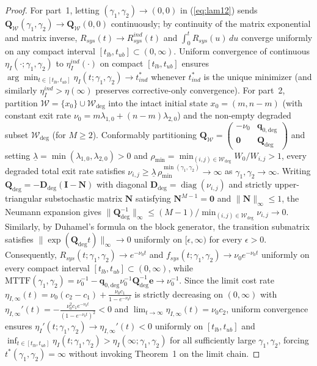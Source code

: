 \documentclass[10pt,a4paper]{article}
\begin{document}
\begin{proof}
For part~1, letting $(\gamma_1, \gamma_2) \to (0, 0)$ in (\ref{eq:lam12}) sends $\mathbf{Q}_{\mathcal{W}}(\gamma_1, \gamma_2) \to \mathbf{Q}_{\mathcal{W}}(0, 0)$ continuously; by continuity of the matrix exponential and matrix inverse, $R_{sys}(t) \to R_{sys}^{ind}(t)$ and $\int_0^t R_{sys}(u)\,du$ converge uniformly on any compact interval $[t_{lb}, t_{ub}] \subset (0, \infty)$. Uniform convergence of continuous $\eta_I(\cdot; \gamma_1, \gamma_2)$ to $\eta_I^{ind}(\cdot)$ on compact $[t_{lb}, t_{ub}]$ ensures $\arg\min_{t \in [t_{lb}, t_{ub}]} \eta_I(t; \gamma_1, \gamma_2) \to t_{ind}^*$ whenever $t_{ind}^*$ is the unique minimizer (and similarly $\eta_I^{ind} > \eta(\infty)$ preserves corrective-only convergence). For part~2, partition $\mathcal{W} = \{x_0\} \cup \mathcal{W}_{\mathrm{deg}}$ into the intact initial state $x_0 = (m, n - m)$ (with constant exit rate $\nu_0 = m\lambda_{1,0} + (n - m)\lambda_{2,0}$) and the non-empty degraded subset $\mathcal{W}_{\mathrm{deg}}$ (for $M \ge 2$). Conformably partitioning $\mathbf{Q}_{\mathcal{W}} = \begin{pmatrix} -\nu_0 & \mathbf{q}_{0,\mathrm{deg}} \\ \mathbf{0} & \mathbf{Q}_{\mathrm{deg}} \end{pmatrix}$ and setting $\underline{\lambda} = \min(\lambda_{1,0}, \lambda_{2,0}) > 0$ and $\rho_{\min} = \min_{(i,j)\in\mathcal{W}_{\mathrm{deg}}} W_0/W_{i,j} > 1$, every degraded total exit rate satisfies $\nu_{i,j} \ge \underline{\lambda}\,\rho_{\min}^{\min(\gamma_1,\gamma_2)} \to \infty$ as $\gamma_1, \gamma_2 \to \infty$. Writing $\mathbf{Q}_{\mathrm{deg}} = -\mathbf{D}_{\mathrm{deg}}(\mathbf{I} - \mathbf{N})$ with diagonal $\mathbf{D}_{\mathrm{deg}} = \operatorname{diag}(\nu_{i,j})$ and strictly upper-triangular substochastic matrix $\mathbf{N}$ satisfying $\mathbf{N}^{M-1} = \mathbf{0}$ and $\|\mathbf{N}\|_\infty \le 1$, the Neumann expansion gives $\|\mathbf{Q}_{\mathrm{deg}}^{-1}\|_\infty \le (M - 1)/\min_{(i,j)\in\mathcal{W}_{\mathrm{deg}}} \nu_{i,j} \to 0$. Similarly, by Duhamel's formula on the block generator, the transition submatrix satisfies $\|\exp(\mathbf{Q}_{\mathrm{deg}} t)\|_\infty \to 0$ uniformly on $[\epsilon, \infty)$ for every $\epsilon > 0$. Consequently, $R_{sys}(t; \gamma_1, \gamma_2) \to e^{-\nu_0 t}$ and $f_{sys}(t; \gamma_1, \gamma_2) \to \nu_0 e^{-\nu_0 t}$ uniformly on every compact interval $[t_{lb}, t_{ub}] \subset (0, \infty)$, while $\mathrm{MTTF}(\gamma_1, \gamma_2) = \nu_0^{-1} - \mathbf{q}_{0,\mathrm{deg}}\nu_0^{-1}\mathbf{Q}_{\mathrm{deg}}^{-1}\mathbf{e} \to \nu_0^{-1}$. Since the limit cost rate $\eta_{I,\infty}(t) = \nu_0(c_2 - c_1) + \frac{\nu_0 c_1}{1 - e^{-\nu_0 t}}$ is strictly decreasing on $(0, \infty)$ with $\eta_{I,\infty}'(t) = -\frac{\nu_0^2 c_1 e^{-\nu_0 t}}{(1 - e^{-\nu_0 t})^2} < 0$ and $\lim_{t\to\infty}\eta_{I,\infty}(t) = \nu_0 c_2$, uniform convergence ensures $\eta_I'(t; \gamma_1, \gamma_2) \to \eta_{I,\infty}'(t) < 0$ uniformly on $[t_{lb}, t_{ub}]$ and $\inf_{t \in [t_{lb}, t_{ub}]} \eta_I(t; \gamma_1, \gamma_2) > \eta_I(\infty; \gamma_1, \gamma_2)$ for all sufficiently large $\gamma_1, \gamma_2$, forcing $t^*(\gamma_1, \gamma_2) = \infty$ without invoking Theorem~1 on the limit chain.

\end{proof}
\end{document}
